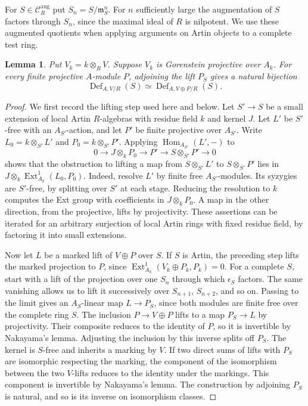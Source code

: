 \documentclass[12pt,a4paper,english,reqno]{amsart}
\numberwithin{equation}{section}
\theoremstyle{plain}
\newtheorem{lemma}[theorem]{Lemma}
\theoremstyle{definition}
\begin{document}
For $S\in\mathcal C_R^{\mathrm{aug}}$ put
$S_n=S/\mathfrak m_S^n$. For $n$ sufficiently large the
augmentation of $S$ factors through $S_n$, since the maximal
ideal of $R$ is nilpotent. We use these augmented quotients
when applying arguments on Artin objects to a complete test ring.

\begin{lemma}\label{lem:artin-deformation-splitting}
Put $V_k=k\otimes_R V$. Suppose $V_k$ is Gorenstein
projective over $A_k$. For every finite projective $A$-module
$P$, adjoining the lift $P_S$ gives a natural bijection
\[
 \operatorname{Def}_{A,V/R}(S)
     \simeq \operatorname{Def}_{A,V\oplus P/R}(S).
\]
\end{lemma}

\begin{proof}
We first record the lifting step used here and below. Let
$S'\to S$ be a small extension of local Artin $R$-algebras
with residue field $k$ and kernel $J$. Let $L'$ be $S'$-free
with an $A_{S'}$-action, and let $P'$ be finite projective over
$A_{S'}$. Write $L_0=k\otimes_{S'} L'$ and $P_0=k\otimes_{S'}P'$.
Applying $\operatorname{Hom}_{A_{S'}}(L',-)$ to
\[
 0\longrightarrow J\otimes_k P_0\longrightarrow P'
       \longrightarrow S\otimes_{S'}P'\longrightarrow 0
\]
shows that the obstruction to lifting a map from
$S\otimes_{S'}L'$ to $S\otimes_{S'}P'$ lies in
$J\otimes_k\operatorname{Ext}^1_{A_k}(L_0,P_0)$.
Indeed, resolve $L'$ by finite free $A_{S'}$-modules. Its
syzygies are $S'$-free, by splitting over $S'$ at each stage.
Reducing the resolution to $k$ computes the Ext group with
coefficients in $J\otimes_kP_0$. A map in the other direction,
from the projective, lifts by projectivity. These assertions
can be iterated for an arbitrary surjection of local Artin
rings with fixed residue field, by factoring it into small
extensions.

Now let $L$ be a marked lift of $V\oplus P$ over $S$.
If $S$ is Artin, the preceding step lifts the marked
projection to $P$, since
$\operatorname{Ext}^1_{A_k}(V_k\oplus P_k,P_k)=0$.
For a complete $S$, start with a lift of the projection over
one $S_n$ through which $\epsilon_S$ factors. The same vanishing
allows us to lift it successively over $S_{n+1}$, $S_{n+2}$,
and so on. Passing to the limit gives an $A_S$-linear map
$L\to P_S$, since both modules are finite free over the
complete ring $S$. The inclusion $P\to V\oplus P$ lifts to a
map $P_S\to L$ by projectivity.
Their composite reduces to the identity of $P$, so it is
invertible by Nakayama's lemma. Adjusting the inclusion by
this inverse splits off $P_S$. The kernel is $S$-free and
inherits a marking by $V$. If two direct sums of lifts with
$P_S$ are isomorphic respecting the marking, the component
of the isomorphism between the two $V$-lifts reduces to the
identity under the markings. This component is invertible
by Nakayama's lemma. The construction by adjoining $P_S$ is
natural, and so is its inverse on isomorphism classes.
\end{proof}
\end{document}
